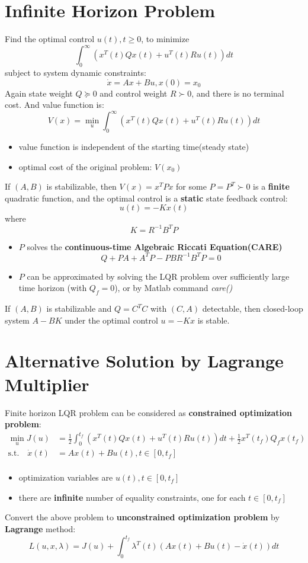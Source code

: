 \documentclass[10pt,a4paper,oneside]{article}
\begin{document}
\section{Infinite Horizon Problem}
Find the optimal control $u(t),t \geq 0$, to minimize
\[
\int_{0}^{\infty}\left(x^{T}(t) Q x(t)+u^{T}(t) R u(t)\right) dt
\]
subject to system dynamic constraints:
\[
\dot{x} = Ax + Bu, x(0)=x_0
\]
Again state weight $Q \succeq 0$ and control weight $R \succ 0$, and there is no terminal cost. And value function is:
\[
V(x) = \min _{u} \int_{0}^{\infty} \left(x^{T}(t) Q x(t)+u^{T}(t) R u(t)\right) dt
\]
\begin{itemize}
\item value function is independent of the starting time(steady state)
\item optimal cost of the original problem: $V(x_0)$
\end{itemize}
If $(A, B)$  is stabilizable, then $V(x)=x^{T} P x$ for some $P=P^{T} \succ 0$ is a \textbf{finite} quadratic function, and the optimal control is a \textbf{static} state feedback control:
\[
u(t)=-Kx(t)
\]
where 
\[
K=R^{-1}B^T P
\]
\begin{itemize}
\item $P$ solves the \textbf{continuous-time Algebraic Riccati Equation(CARE)}
\[
Q+P A+A^{T} P -P B R^{-1} B^{T} P = 0
\]
\item $P$ can be approximated by solving the LQR problem over sufficiently large time horizon (with $Q_f=0$), or by Matlab command \textit{care()}
\end{itemize}
If $(A, B)$  is stabilizable and $Q =C^T C$ with $(C,A)$ detectable, then closed-loop system $A-BK$ under the optimal control $u=-Kx$ is stable.

\section{Alternative Solution by Lagrange Multiplier}
Finite horizon LQR problem can be considered as \textbf{constrained optimization problem}:
\begin{align*}
\min _{u} J(u) &=\frac{1}{2} \int_{0}^{t_{f}}\left(x^{T}(t) Q x(t)+u^{T}(t) R u(t)\right) dt + \frac{1}{2} x^{T}\left(t_{f}\right) Q_{f} x\left(t_{f}\right)\\
\text{s.t.} \quad \dot{x}(t) &= Ax(t)+Bu(t),t\in[0,t_f]\\
\end{align*}
\begin{itemize}
\item optimization variables are $u(t),t \in [0, t_f]$
\item there are \textbf{infinite} number of equality constraints, one for each $t\in[0,t_f]$
\end{itemize}
Convert the above problem to \textbf{unconstrained optimization problem} by \textbf{Lagrange} method:
\[
L(u, x, \lambda)= J(u) + \int_{0}^{t_{f}} \lambda^{T}(t)(A x(t)+B u(t)-\dot{x}(t)) dt
\]
\end{document}
